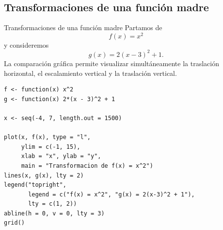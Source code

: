 \documentclass[aspectratio=169,10pt]{beamer}
\begin{document}
\subsection{Transformaciones de una función madre}
\begin{frame}{Transformaciones de una función madre}
Partamos de
\[
f(x)=x^2
\]
y consideremos
\[
g(x)=2(x-3)^2+1.
\]
La comparación gráfica permite visualizar simultáneamente la traslación
horizontal, el escalamiento vertical y la traslación vertical.

\begin{center}
\end{center}

\begin{verbatim}
f <- function(x) x^2
g <- function(x) 2*(x - 3)^2 + 1

x <- seq(-4, 7, length.out = 1500)

plot(x, f(x), type = "l",
     ylim = c(-1, 15),
     xlab = "x", ylab = "y",
     main = "Transformacion de f(x) = x^2")
lines(x, g(x), lty = 2)
legend("topright",
       legend = c("f(x) = x^2", "g(x) = 2(x-3)^2 + 1"),
       lty = c(1, 2))
abline(h = 0, v = 0, lty = 3)
grid()
\end{verbatim}

\end{frame}
\end{document}
